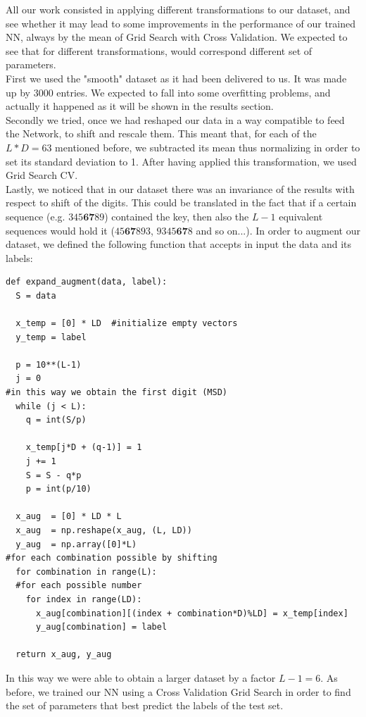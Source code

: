 \documentclass[prl,twocolumn]{revtex4-1}
\begin{document}
All our work consisted in applying different transformations to our dataset, and see whether it may lead to some improvements in the performance of our trained NN, always by the mean of Grid Search with Cross Validation. We expected to see that for different transformations, would correspond different set of parameters.\\
First we used the "smooth" dataset as it had been delivered to us. It was made up by 3000 entries. We expected to fall into some overfitting problems, and actually it happened as it will be shown in the results section.\\
Secondly we tried, once we had reshaped our data in a way compatible to feed the Network, to shift and rescale them. This meant that, for each of the $L*D = 63$ mentioned before, we subtracted its mean thus normalizing in order to set its standard deviation to 1. After having applied this transformation, we used Grid Search CV.\\
Lastly, we noticed that in our dataset there was an invariance of the results with respect to shift of the digits. This could be translated in the fact that if a certain sequence (e.g. $345\textbf{67}89$) contained the key, then also the $L-1$ equivalent sequences would hold it ($45\textbf{67}893$, $9345\textbf{67}8$ and so on...). In order to augment our dataset, we defined the following function that accepts in input the data and its labels:
\begin{verbatim}
def expand_augment(data, label):
  S = data

  x_temp = [0] * LD  #initialize empty vectors
  y_temp = label

  p = 10**(L-1)
  j = 0
#in this way we obtain the first digit (MSD)
  while (j < L):  
    q = int(S/p)

    x_temp[j*D + (q-1)] = 1
    j += 1
    S = S - q*p
    p = int(p/10)

  x_aug  = [0] * LD * L
  x_aug  = np.reshape(x_aug, (L, LD))
  y_aug  = np.array([0]*L)
#for each combination possible by shifting
  for combination in range(L): 
  #for each possible number 
    for index in range(LD): 
      x_aug[combination][(index + combination*D)%LD] = x_temp[index]
      y_aug[combination] = label 

  return x_aug, y_aug
\end{verbatim}

In this way we were able to obtain a larger dataset by a factor $L-1 = 6$. As before, we trained our NN using a Cross Validation Grid Search in order to find the set of parameters that best predict the labels of the test set.
\end{document}
